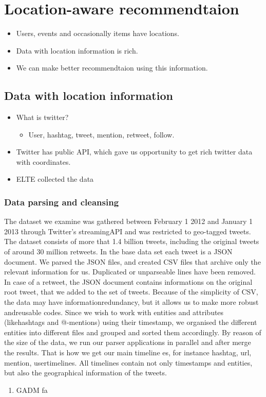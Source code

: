 \chapter{Location-aware recommendtaion}
\begin{itemize}
\item Users, events and occasionally items have locations.
\item Data with location information is rich.
\item We can make better recommendtaion using this information.
\end{itemize}

\section{Data with location information}
\begin{itemize}
\item What is twitter?
  \begin{itemize}
    \item User, hashtag, tweet, mention, retweet, follow.
  \end{itemize}
\item Twitter has public API, which gave us opportunity to get rich twitter
  data with coordinates.
\item ELTE collected the data
\end{itemize}

\subsection{Data parsing and cleansing}
The dataset we examine was gathered between February 1 2012 and January 1 2013
through Twitter's streamingAPI and was restricted to geo-tagged tweets. The
dataset consists of more that 1.4 billion tweets, including the original
tweets of around 30 million retweets. In the base data set each tweet is a
JSON document. We parsed the JSON files, and created CSV files that archive
only the relevant information for us. Duplicated or unparseable lines have been
removed. In case of a retweet, the JSON document contains informations on the
original root tweet, that we added to the set of tweets. Because of the simplicity of CSV, the data may have informationredundancy, but it allows us to make more robust andreusable codes. Since we wish to work with entities and
attributes (likehashtags and @-mentions) using their timestamp, we organised
the different entities into different files and grouped and sorted them
accordingly. By reason of the size of the data, we run our parser applications
in parallel and after merge the results. That is how we get our main timeline
es, for instance hashtag, url, mention, usertimelines. All timelines contain
not only timestamps and entities, but also the geographical information of the
tweets.
\begin{enumerate}
\item GADM fa
\end{enumerate}
